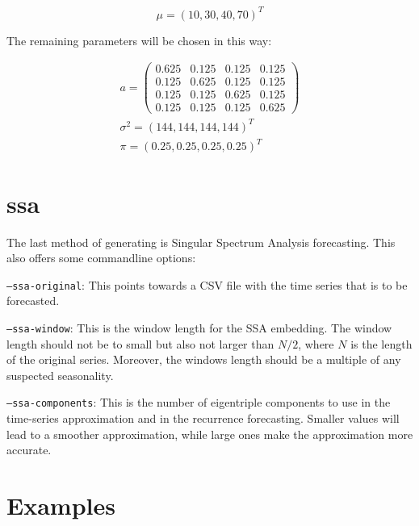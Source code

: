 \begin{equation}
    \mu = (10, 30, 40, 70)^T
\end{equation}

The remaining parameters will be chosen in this way:

\begin{equation}
    \begin{split}
    a = 
    \begin{pmatrix}
        0.625 & 0.125 & 0.125 & 0.125 \\
        0.125 & 0.625 & 0.125 & 0.125 \\
        0.125 & 0.125 & 0.625 & 0.125 \\
        0.125 & 0.125 & 0.125 & 0.625
    \end{pmatrix} \\
    \sigma^2 = (144, 144, 144, 144)^T \\
    \pi = (0.25, 0.25, 0.25, 0.25)^T 
\end{split}
\end{equation}

\section{ssa}

The last method of generating is Singular Spectrum Analysis forecasting. This also offers some commandline options: 

\texttt{---ssa-original}: This points towards a CSV file with the time series that is to be forecasted. 

\texttt{---ssa-window}: This is the window length for the SSA embedding. The window length should not be to small but also not larger than $N/2$, where $N$ is the length of the original series. Moreover, the windows length should be a multiple of any suspected seasonality.

\texttt{---ssa-components}: This is the number of eigentriple components to use in the time-series approximation and in the recurrence forecasting. Smaller values will lead to a smoother approximation, while large ones make the approximation more accurate. 

\section{Examples}

